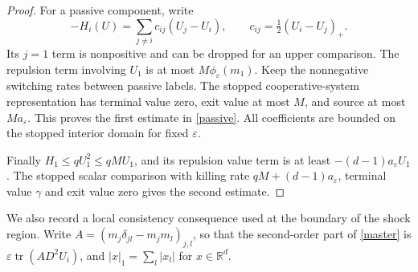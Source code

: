 \documentclass[11pt]{article}
\newcommand{\R}{\mathbb R}
\newcommand{\eps}{\varepsilon}
\begin{document}
\begin{proof}
For a passive component, write
\[
 -H_i(U)=\sum_{j\ne i}c_{ij}(U_j-U_i),\qquad c_{ij}=\tfrac12(U_i-U_j)_+.
\]
Its $j=1$ term is nonpositive and can be dropped for an upper comparison. The repulsion term involving $U_1$ is at most $M\phi_\eps(m_1)$. Keep the nonnegative switching rates between passive labels. The stopped cooperative-system representation has terminal value zero, exit value at most $M$, and source at most $Ma_\eps$. This proves the first estimate in \eqref{passive}. All coefficients are bounded on the stopped interior domain for fixed $\eps$.

Finally $H_1\le qU_1^2\le qMU_1$, and its repulsion value term is at least $-(d-1)a_\eps U_1$. The stopped scalar comparison with killing rate $qM+(d-1)a_\eps$, terminal value $\gamma$ and exit value zero gives the second estimate.
\end{proof}

We also record a local consistency consequence used at the boundary of the shock region. Write $A=(m_j\delta_{jl}-m_jm_l)_{j,l}$, so that the second-order part of \eqref{master} is $\eps\operatorname{tr}(AD^2U_i)$, and $|x|_1=\sum_l|x_l|$ for $x\in\R^d$.
\end{document}
